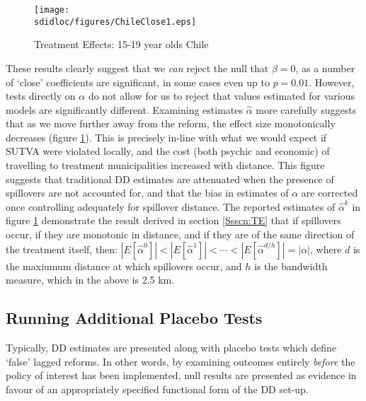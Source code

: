\begin{figure}[h!]
\texttt{[image: \\sdidloc/figures/ChileClose1.eps]}
\caption{Treatment Effects: 15-19 year olds Chile}
\label{Sfig:ChileAlpha}
\vspace{2mm}
\end{figure}

These results clearly suggest that we \emph{can} reject the null that $\beta=0$, 
as a number of `close' coefficients are significant, in some cases even up to 
$p=0.01$.  However, tests directly on $\alpha$ do not allow for us to reject that 
values estimated for various models are significantly different.  Examining 
estimates $\hat\alpha$ more carefully suggests that as we move further away from 
the reform, the effect size monotonically decreases (figure 
\ref{Sfig:ChileAlpha}).  This is precisely in-line with what we would expect if 
SUTVA were violated locally, and the cost (both psychic and economic) of 
travelling to treatment municipalities increased with distance.  This figure
suggests that traditional DD estimates are attenuated when the presence of 
spillovers are not accounted for, and that the bias in estimates of $\alpha$ are
corrected once controlling adequately for spillover distance.  The reported
estimates of $\hat\alpha^k$ in figure \ref{Sfig:ChileAlpha} demonstrate the
result derived in section \ref{Ssscn:TE} that if spillovers occur, if they
are monotonic in distance, and if they are of the same direction of the treatment
itself, then:
$|E[\hat\alpha^0]|<|E[\hat\alpha^1]|<\cdots<|E[\hat\alpha^{d/h}]|=|\alpha|$,
where $d$ is the maxiumum distance at which spillovers occur, and $h$ is the
bandwidth measure, which in the above is 2.5 km.

\subsection{Running Additional Placebo Tests}
Typically, DD estimates are presented along with placebo tests which define 
`false' lagged reforms.  In other words, by examining outcomes entirely 
\emph{before} the policy of interest has been implemented, null results are 
presented as evidence in favour of an appropriately specified functional form of 
the DD set-up.

